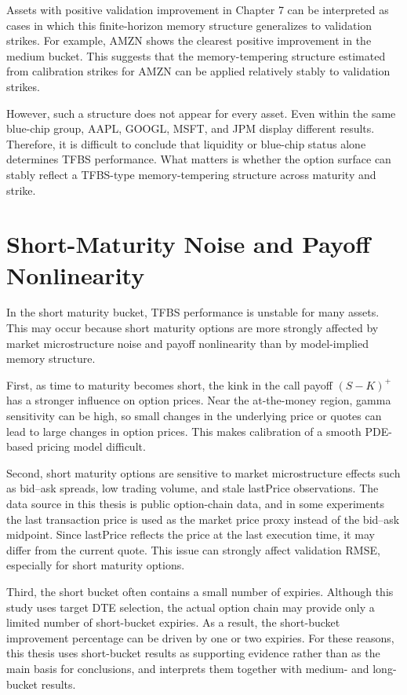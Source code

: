 \documentclass[11pt,a4paper]{report}
\begin{document}
Assets with positive validation improvement in Chapter 7 can be interpreted as cases in which this finite-horizon memory structure generalizes to validation strikes. For example, AMZN shows the clearest positive improvement in the medium bucket. This suggests that the memory-tempering structure estimated from calibration strikes for AMZN can be applied relatively stably to validation strikes.

However, such a structure does not appear for every asset. Even within the same blue-chip group, AAPL, GOOGL, MSFT, and JPM display different results. Therefore, it is difficult to conclude that liquidity or blue-chip status alone determines TFBS performance. What matters is whether the option surface can stably reflect a TFBS-type memory-tempering structure across maturity and strike.

\section{Short-Maturity Noise and Payoff Nonlinearity}

In the short maturity bucket, TFBS performance is unstable for many assets. This may occur because short maturity options are more strongly affected by market microstructure noise and payoff nonlinearity than by model-implied memory structure.

First, as time to maturity becomes short, the kink in the call payoff $(S-K)^+$ has a stronger influence on option prices. Near the at-the-money region, gamma sensitivity can be high, so small changes in the underlying price or quotes can lead to large changes in option prices. This makes calibration of a smooth PDE-based pricing model difficult.

Second, short maturity options are sensitive to market microstructure effects such as bid--ask spreads, low trading volume, and stale lastPrice observations. The data source in this thesis is public option-chain data, and in some experiments the last transaction price is used as the market price proxy instead of the bid--ask midpoint. Since lastPrice reflects the price at the last execution time, it may differ from the current quote. This issue can strongly affect validation RMSE, especially for short maturity options.

Third, the short bucket often contains a small number of expiries. Although this study uses target DTE selection, the actual option chain may provide only a limited number of short-bucket expiries. As a result, the short-bucket improvement percentage can be driven by one or two expiries. For these reasons, this thesis uses short-bucket results as supporting evidence rather than as the main basis for conclusions, and interprets them together with medium- and long-bucket results.
\end{document}
